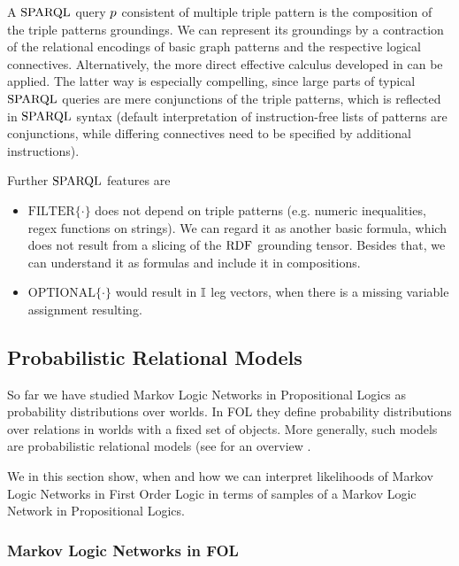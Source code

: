 A $\mathrm{SPARQL}$ query $p$ consistent of multiple triple pattern is the composition of the triple patterns groundings.
We can represent its groundings by a contraction of the relational encodings of basic graph patterns and the respective logical connectives.
Alternatively, the more direct effective calculus developed in  can be applied.
The latter way is especially compelling, since large parts of typical $\mathrm{SPARQL}$ queries are mere conjunctions of the triple patterns, which is reflected in $\mathrm{SPARQL}$ syntax (default interpretation of instruction-free lists of patterns are conjunctions, while differing connectives need to be specified by additional instructions).



Further $\mathrm{SPARQL}$ features are
\begin{itemize}
	\item $\mathrm{FILTER}\{\cdot\}$ does not depend on triple patterns (e.g. numeric inequalities, regex functions on strings). 
		We can regard it as another basic formula, which does not result from a slicing of the $\mathrm{RDF}$ grounding tensor.
		Besides that, we can understand it as formulas and include it in compositions.
	\item $\mathrm{OPTIONAL}\{\cdot\}$ would result in $\mathbb{I}$ leg vectors, when there is a missing variable assignment resulting.
\end{itemize}







\subsection{Probabilistic Relational Models}

So far we have studied Markov Logic Networks in Propositional Logics as probability distributions over worlds.
In FOL they define probability distributions over relations in worlds with a fixed set of objects.
More generally, such models are probabilistic relational models (see for an overview \cite{getoor_introduction_2019}.

%
We in this section show, when and how we can interpret likelihoods of Markov Logic Networks in First Order Logic in terms of samples of a Markov Logic Network in Propositional Logics.

\subsubsection{Markov Logic Networks in FOL}

